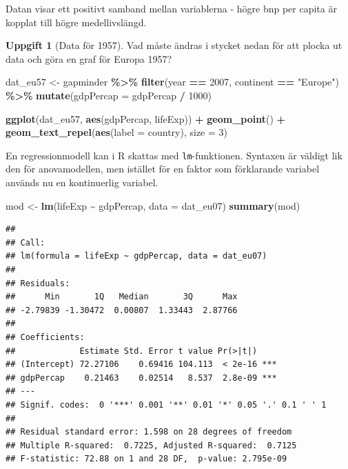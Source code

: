 \documentclass[
]{book}
\newenvironment{Shaded}{\begin{snugshade}}{\end{snugshade}}
\newcommand{\AttributeTok}[1]{\textcolor[rgb]{0.13,0.29,0.53}{#1}}
\newcommand{\DecValTok}[1]{\textcolor[rgb]{0.00,0.00,0.81}{#1}}
\newcommand{\FunctionTok}[1]{\textcolor[rgb]{0.13,0.29,0.53}{\textbf{#1}}}
\newcommand{\NormalTok}[1]{#1}
\newcommand{\OtherTok}[1]{\textcolor[rgb]{0.56,0.35,0.01}{#1}}
\newcommand{\SpecialCharTok}[1]{\textcolor[rgb]{0.81,0.36,0.00}{\textbf{#1}}}
\newcommand{\StringTok}[1]{\textcolor[rgb]{0.31,0.60,0.02}{#1}}
\theoremstyle{definition}
\theoremstyle{definition}
\theoremstyle{definition}
\newtheorem{exercise}{Uppgift}[chapter]
\theoremstyle{definition}
\theoremstyle{remark}
\begin{document}
Datan visar ett positivt samband mellan variablerna - högre bnp per capita är kopplat till högre medellivslängd.

\begin{exercise}[Data för 1957]

Vad måste ändras i stycket nedan för att plocka ut data och göra en graf för Europa 1957?

\begin{Shaded}
\begin{Highlighting}[]
\NormalTok{dat\_eu57 }\OtherTok{\textless{}{-}}\NormalTok{ gapminder }\SpecialCharTok{\%\textgreater{}\%} 
  \FunctionTok{filter}\NormalTok{(year }\SpecialCharTok{==} \DecValTok{2007}\NormalTok{, continent }\SpecialCharTok{==} \StringTok{"Europe"}\NormalTok{) }\SpecialCharTok{\%\textgreater{}\%} 
  \FunctionTok{mutate}\NormalTok{(}\AttributeTok{gdpPercap =}\NormalTok{ gdpPercap }\SpecialCharTok{/} \DecValTok{1000}\NormalTok{)}

\FunctionTok{ggplot}\NormalTok{(dat\_eu57, }\FunctionTok{aes}\NormalTok{(gdpPercap, lifeExp)) }\SpecialCharTok{+}
  \FunctionTok{geom\_point}\NormalTok{() }\SpecialCharTok{+}
  \FunctionTok{geom\_text\_repel}\NormalTok{(}\FunctionTok{aes}\NormalTok{(}\AttributeTok{label =}\NormalTok{ country), }\AttributeTok{size =} \DecValTok{3}\NormalTok{)}
\end{Highlighting}
\end{Shaded}

\end{exercise}

En regressionmodell kan i R skattas med \texttt{lm}-funktionen. Syntaxen är väldigt lik den för anovamodellen, men istället för en faktor som förklarande variabel används nu en kontinuerlig variabel.

\begin{Shaded}
\begin{Highlighting}[]
\NormalTok{mod }\OtherTok{\textless{}{-}} \FunctionTok{lm}\NormalTok{(lifeExp }\SpecialCharTok{\textasciitilde{}}\NormalTok{ gdpPercap, }\AttributeTok{data =}\NormalTok{ dat\_eu07)}
\FunctionTok{summary}\NormalTok{(mod)}
\end{Highlighting}
\end{Shaded}

\begin{verbatim}
## 
## Call:
## lm(formula = lifeExp ~ gdpPercap, data = dat_eu07)
## 
## Residuals:
##      Min       1Q   Median       3Q      Max 
## -2.79839 -1.30472  0.00807  1.33443  2.87766 
## 
## Coefficients:
##             Estimate Std. Error t value Pr(>|t|)    
## (Intercept) 72.27106    0.69416 104.113  < 2e-16 ***
## gdpPercap    0.21463    0.02514   8.537  2.8e-09 ***
## ---
## Signif. codes:  0 '***' 0.001 '**' 0.01 '*' 0.05 '.' 0.1 ' ' 1
## 
## Residual standard error: 1.598 on 28 degrees of freedom
## Multiple R-squared:  0.7225, Adjusted R-squared:  0.7125 
## F-statistic: 72.88 on 1 and 28 DF,  p-value: 2.795e-09
\end{verbatim}
\end{document}

